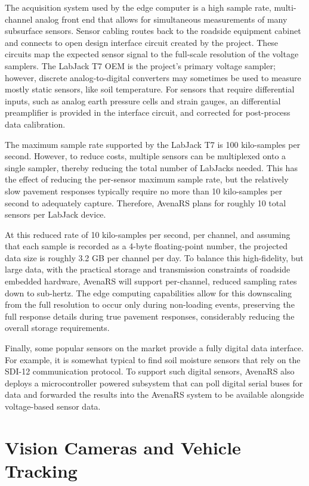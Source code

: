 \documentclass[conference]{IEEEtran}
\begin{document}
The acquisition system used by the edge computer is a high sample rate, multi-channel analog front end that allows for simultaneous measurements of many subsurface sensors.
Sensor cabling routes back to the roadside equipment cabinet and connects to open design interface circuit created by the project.
These circuits map the expected sensor signal to the full-scale resolution of the voltage samplers.
The LabJack T7 OEM \cite{labjack_t7_datasheet} is the project's primary voltage sampler; however, discrete analog-to-digital converters may sometimes be used to measure mostly static sensors, like soil temperature.
For sensors that require differential inputs, such as analog earth pressure cells and strain gauges, an differential preamplifier is provided in the interface circuit, and corrected for post-process data calibration.

The maximum sample rate supported by the LabJack T7 is 100 kilo-samples per second. 
However, to reduce costs, multiple sensors can be multiplexed onto a single sampler, thereby reducing the total number of LabJacks needed.
This has the effect of reducing the per-sensor maximum sample rate, but the relatively slow pavement responses typically require no more than 10 kilo-samples per second to adequately capture.
Therefore, AvenaRS plans for roughly 10 total sensors per LabJack device.

At this reduced rate of 10 kilo-samples per second, per channel, and assuming that each sample is recorded as a 4-byte floating-point number, the projected data size is roughly 3.2 GB per channel per day.
To balance this high-fidelity, but large data, with the practical storage and transmission constraints of roadside embedded hardware, AvenaRS will support per-channel, reduced sampling rates down to sub-hertz.
The edge computing capabilities allow for this downscaling from the full resolution to occur only during non-loading events, preserving the full response details during true pavement responses, considerably reducing the overall storage requirements.

Finally, some popular sensors on the market provide a fully digital data interface.
For example, it is somewhat typical to find soil moisture sensors that rely on the SDI-12 communication protocol.
To support such digital sensors, AvenaRS also deploys a microcontroller powered subsystem that can poll digital serial buses for data and forwarded the results into the AvenaRS system to be available alongside voltage-based sensor data.

\section{Vision Cameras and Vehicle Tracking}
\end{document}
